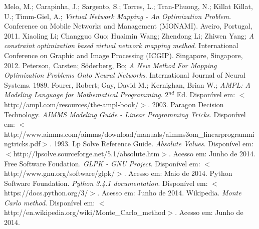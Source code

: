 \documentclass{article}
\begin{document}
\begin{thebibliography}{1}
	Melo, M.; Carapinha, J.; Sargento, S.; Torres, L.; Tran-Phuong, N.; Killat Killat, U.; Timm-Giel, A.;
	\emph{Virtual Network Mapping - An Optimization Problem}.
	Conference on Mobile Networks and Management (MONAMI).
	Aveiro, Portugal, 2011.
\bibitem{}
	Xiaoling Li; Changguo Guo; Huaimin Wang; Zhendong Li; Zhiwen Yang;
	\emph{A constraint optimization based virtual network mapping method}.
	International Conference on Graphic and Image Processing (ICGIP).
	Singapore, Singapore, 2012.
\bibitem{}
	Peterson, Carsten; Söderberg, Bo;
	\emph{A New Method For Mapping Optimization Problems Onto Neural Networks}.
	International Journal of Neural Systems.
	1989.
	Fourer, Robert; Gay, David M.; Kernighan, Brian W.;
	\emph{AMPL: A Modeling Language for Mathematical Programming}.
	2$^{nd}$ Ed.
	Disponível em: $<$http://ampl.com/resources/the-ampl-book/$>$.
	2003.
\bibitem{}
	Paragon Decision Technology.
	\emph{AIMMS Modeling Guide - Linear Programming Tricks}.
	Disponível em: $<$http://www.aimms.com/aimms/download/manuals/aimms3om\_linearprogrammingtricks.pdf$>$.
	1993.
	Lp Solve Reference Guide.
	\emph{Absolute Values}.
	Disponível em: $<$http://lpsolve.sourceforge.net/5.1/absolute.htm$>$.
	Acesso em: Junho de 2014.
	Free Software Foudation.
	\emph{GLPK - GNU Project}.
	Disponível em: $<$http://www.gnu.org/software/glpk/$>$.
	Acesso em: Maio de 2014.
	Python Software Foundation.
	\emph{Python 3.4.1 documentation}.
	Disponível em: $<$https://docs.python.org/3/$>$.
	Acesso em: Junho de 2014.
\bibitem{}
	Wikipedia.
	\emph{Monte Carlo method}.
	Disponível em: $<$http://en.wikipedia.org/wiki/Monte\_Carlo\_method$>$.
	Acesso em: Junho de 2014.


\end{thebibliography}
\end{document}
